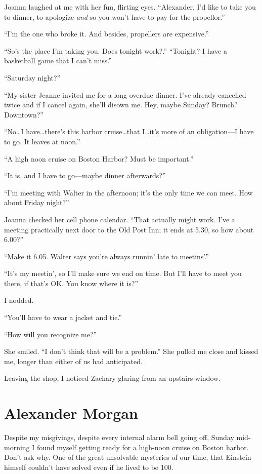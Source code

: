 Joanna laughed at me with her fun, flirting eyes. ``Alexander, I'd like
to take you to dinner, to apologize \emph{and} so you won't have to pay
for the propellor.''

``I'm the one who broke it. And besides, propellers are expensive.''

``So's the place I'm taking you. Does tonight work?.'' ``Tonight? I have
a basketball game that I can't miss.''

``Saturday night?''

``My sister Jeanne invited me for a long overdue dinner. I've already
cancelled twice and if I cancel again, she'll disown me. Hey, maybe
Sunday? Brunch? Downtown?''

``No\ldots I have\ldots there's this harbor cruise\ldots that
I\ldots it's more of an obligation---I have to go. It leaves at noon.''

``A high noon cruise on Boston Harbor? Must be important.''

``It is, and I have to go---maybe dinner afterwards?''

``I'm meeting with Walter in the afternoon; it's the only time we can
meet. How about Friday night?''

Joanna checked her cell phone calendar. ``That actually might work. I've
a meeting practically next door to the Old Post Inn; it ends at 5.30, so
how about 6.00?''

``Make it 6.05. Walter says you're always runnin' late to meetins'.''

``It's my meetin', so I'll make sure we end on time. But I'll have to
meet you there, if that's OK. You know where it is?''

I nodded.

``You'll have to wear a jacket and tie.''

``How will you recognize me?''

She smiled. ``I don't think that will be a problem.'' She pulled me
close and kissed me, longer than either of us had anticipated.

Leaving the shop, I noticed Zachary glaring from an upstairs window.

\chapter{Alexander Morgan}

\titlemark

Despite my misgivings, despite every internal alarm bell going off,
Sunday mid-morning I found myself getting ready for a high-noon cruise
on Boston harbor. Don't ask why. One of the great unsolvable mysteries
of our time, that Einstein himself couldn't have solved even if he lived
to be 100.

